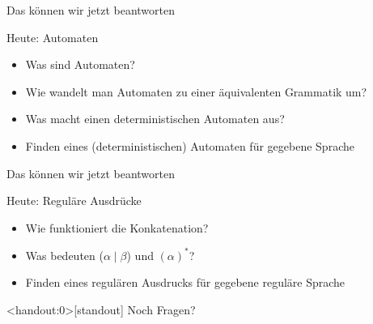 \begin{frame}[fragile]{Das können wir jetzt beantworten}
  \begin{alertblock}{Heute: Automaten}
    \begin{itemize}
      \item Was sind Automaten?
      \item Wie wandelt man Automaten zu einer äquivalenten Grammatik um?
      \item Was macht einen deterministischen Automaten aus?
      \item Finden eines (deterministischen) Automaten für gegebene Sprache
    \end{itemize}
  \end{alertblock}
\end{frame}

\begin{frame}[fragile]{Das können wir jetzt beantworten}
  \begin{alertblock}{Heute: Reguläre Ausdrücke}
    \begin{itemize}
      \item Wie funktioniert die Konkatenation?
      \item Was bedeuten ($\alpha \mid \beta$) und $(\alpha)^*$?
      \item Finden eines regulären Ausdrucks für gegebene reguläre Sprache
    \end{itemize}
  \end{alertblock}
\end{frame}

\begin{frame}<handout:0>[standout]
  Noch Fragen?
\end{frame}

